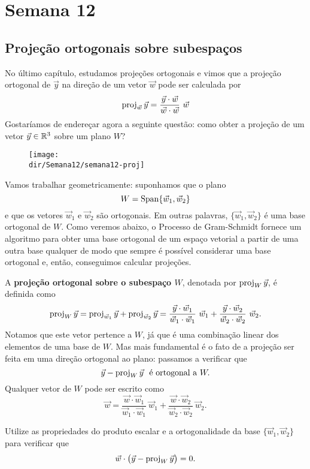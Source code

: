 \documentclass[../livro.tex]{subfiles}  %
\providecommand{\dir}{..}
\begin{document}
	
	\chapter{Semana 12}

\section{Projeção ortogonais sobre subespaços}

No último capítulo, estudamos projeções ortogonais e vimos que a projeção ortogonal de $\vec{y}$ na direção de um vetor $\vec{w}$ pode ser calculada por
\[
\proj_{\vec{w}} \vec{y} = \frac{\vec{y} \cdot \vec{w}}{\vec{w} \cdot \vec{w}} \ \vec{w}
\] Gostaríamos de endereçar agora a seguinte questão: como obter a projeção de um vetor $\vec{y} \in \mathbb{R}^3$ sobre um plano $W$?

\begin{figure}[h!]
\begin{center}
\texttt{[image: \\dir/Semana12/semana12-proj]}
\end{center}
\end{figure}
\noindent Vamos trabalhar geometricamente: suponhamos que o plano
\[
W = \operatorname{Span} \{\vec{w}_1, \vec{w}_2\}
\] e que os vetores $\vec{w}_1$ e $\vec{w}_2$ são ortogonais. Em outras palavras, $\{\vec{w}_1, \vec{w}_2\}$ é uma base ortogonal de $W$. Como veremos abaixo, o Processo de Gram-Schmidt fornece um algoritmo para obter uma base ortogonal de um espaço vetorial a partir de uma outra base qualquer de modo que sempre é possível considerar uma base ortogonal e, então, conseguimos calcular projeções.

A \textbf{projeção ortogonal sobre o subespaço $W$}, denotada por $\operatorname{proj}_W \vec{y}$, é definida como
\[
\operatorname{proj}_W \vec{y} = \operatorname{proj}_{\vec{w}_1} \vec{y} + \operatorname{proj}_{\vec{w}_2} \vec{y} = \frac{\vec{y} \cdot \vec{w}_1}{\vec{w}_1 \cdot \vec{w}_1} \ \vec{w}_1 + \frac{\vec{y} \cdot \vec{w}_2}{\vec{w}_2 \cdot \vec{w}_2} \ \vec{w}_2.
\] Notamos que este vetor pertence a $W$, já que é uma combinação linear dos elementos de uma base de $W$. Mas mais fundamental é o fato de a projeção ser feita em uma direção ortogonal ao plano: passamos a verificar que
\[
\vec{y} - \operatorname{proj}_W \vec{y} \ \text{ é ortogonal a }  W.
\] Qualquer vetor de $W$ pode ser escrito como
\[
\vec{w} = \frac{\vec{w} \cdot \vec{w}_1}{\vec{w}_1 \cdot \vec{w}_1} \ \vec{w}_1 + \frac{\vec{w} \cdot \vec{w}_2}{\vec{w}_2 \cdot \vec{w}_2} \ \vec{w}_2.
\]

\begin{exercise}\label{exercise:proj}
Utilize as propriedades do produto escalar e a ortogonalidade da base $\{\vec{w}_1, \vec{w}_2\}$ para verificar que
\[
\vec{w} \cdot  \big( \vec{y} - \operatorname{proj}_W \vec{y} \big) = 0.
\]
\end{exercise}
\end{document}

